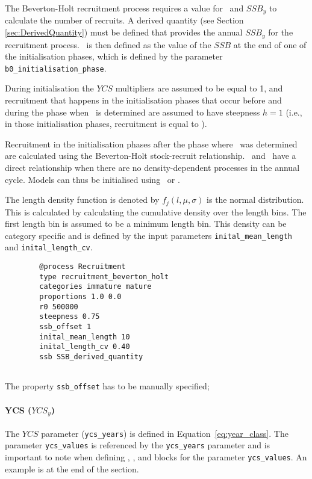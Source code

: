 The Beverton-Holt recruitment process requires a value for \Bzero\ and $SSB_y$ to calculate the number of recruits. A derived quantity (see Section \ref{sec:DerivedQuantity}) must be defined that provides the annual $SSB_y$ for the recruitment process. \Bzero\ is then defined as the value of the $SSB$ at the end of one of the initialisation phases, which is defined by the parameter \texttt{b0\_initialisation\_phase}.

During initialisation the $YCS$ multipliers are assumed to be equal to 1, and recruitment that happens in the initialisation phases that occur before and during the phase when \Bzero\ is determined are assumed to have steepness $h=1$ (i.e., in those initialisation phases, recruitment is equal to \Rzero).

Recruitment in the initialisation phases after the phase where \Bzero\ was determined are calculated using the Beverton-Holt stock-recruit relationship. \Rzero\ and \Bzero\ have a direct relationship when there are no density-dependent processes in the annual cycle. Models can thus be initialised using \Bzero\ or \Rzero.


The length density function is denoted by \(f_j(l,\mu, \sigma)\) is the normal distribution. This is calculated by calculating the cumulative density over the length bins. The first length bin is assumed to be a minimum length bin. This density can be category specific and is defined by the input parameters \texttt{inital\_mean\_length} and \texttt{inital\_length\_cv}.


{\small{\begin{verbatim}
		@process Recruitment
		type recruitment_beverton_holt
		categories immature mature
		proportions 1.0 0.0
		r0 500000
		steepness 0.75
		ssb_offset 1
		inital_mean_length 10
		inital_length_cv 0.40
		ssb SSB_derived_quantity
		
		\end{verbatim}}}

The property \texttt{ssb\_offset} has to be manually specified;

\paragraph*{YCS ($YCS_y$)}

The $YCS$ parameter (\texttt{ycs\_years}) is defined in Equation~\eqref{eq:year_class}. The parameter \texttt{ycs\_values} is referenced by the \texttt{ycs\_years} parameter and is important to note when defining , , and  blocks for the parameter \texttt{ycs\_values}. An example is at the end of the section.

